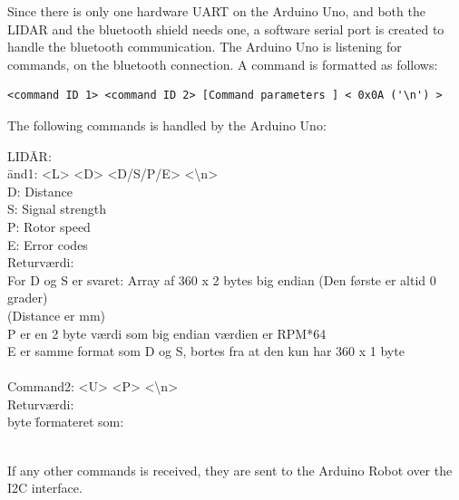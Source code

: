 Since there is only one hardware UART on the Arduino Uno, and both the LIDAR and the bluetooth shield needs one, a software serial port is created to handle the bluetooth communication. The Arduino Uno is listening for commands, on the bluetooth connection. A command is formatted as follows:
\begin{verbatim}
<command ID 1> <command ID 2> [Command parameters ] < 0x0A ('\n') >
\end{verbatim}
The following commands is handled by the Arduino Uno: 
\begin{tabbing}	
{LID}\={AR:}\\
\={and1: <L> <D> <D/S/P/E> <\textbackslash n>} \\
\> \> D: Distance \\
\> \> S: Signal strength\\
\> \> P: Rotor speed\\
\> \> E: Error codes\\
\> Returværdi:\\
\> \> {For D og S er svaret: Array af 360 x 2 bytes big endian (Den første er altid 0 grader)} \\ \> \> {(Distance er mm)} \\
\> \> {P er en 2 byte værdi som big endian værdien er RPM*64} \\
\> \> {E er samme format som D og S, bortes fra at den kun har 360 x 1 byte} \\
\\
\> Command2: <U> <P> <\textbackslash n>\\
\> Returværdi: \\
\>  byte \= formateret som: \\
\> \>  \\
\> \>  

\end{tabbing}	

If any other commands is received, they are sent to the Arduino Robot over the I2C interface. 

